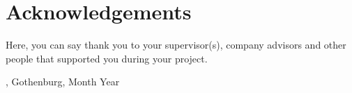 \thispagestyle{plain}			%
\section*{Acknowledgements}
Here, you can say thank you to your supervisor(s), company advisors and other people that supported you during your project.

\vspace{1.5cm}
\hfill
\me, Gothenburg, Month Year

\newpage				%
\thispagestyle{empty}
\mbox{}
